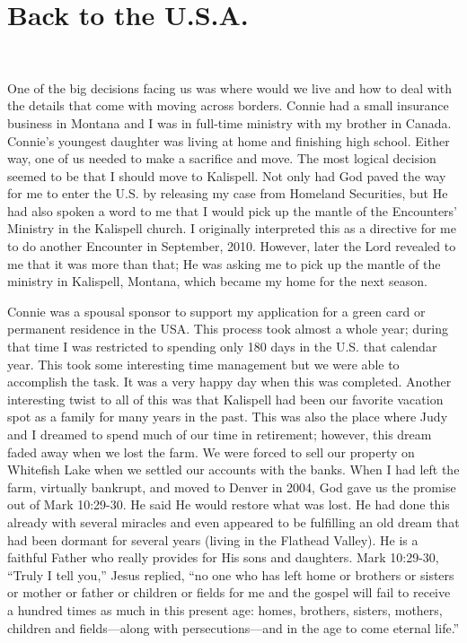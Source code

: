 \documentclass[oneside]{book}
\begin{document}
\section{Back to the U.S.A.}
\

One of the big decisions facing us was where would we live and how to deal with the details that come with moving across borders. Connie had a small insurance business in Montana and I was in full-time ministry with my brother in Canada. Connie’s youngest daughter was living at home and finishing high school. Either way, one of us needed to make a sacrifice and move. The most logical decision seemed to be that I should move to Kalispell. Not only had God paved the way for me to enter the U.S. by releasing my case from Homeland Securities, but He had also spoken a word to me that I would pick up the mantle of the Encounters’ Ministry in the Kalispell church. I originally interpreted this as a directive for me to do another Encounter in September, 2010. However, later the Lord revealed to me that it was more than that; He was asking me to pick up the mantle of the ministry in Kalispell, Montana, which became my home for the next season.

Connie was a spousal sponsor to support my application for a green card or permanent residence in the USA. This process took almost a whole year; during that time I was restricted to spending only 180 days in the U.S. that calendar year. This took some interesting time management but we were able to accomplish the task. It was a very happy day when this was completed. Another interesting twist to all of this was that Kalispell had been our favorite vacation spot as a family for many years in the past. This was also the place where Judy and I dreamed to spend much of our time in retirement; however, this dream faded away when we lost the farm. We were forced to sell our property on Whitefish Lake when we settled our accounts with the banks. When I had left the farm, virtually bankrupt, and moved to Denver in 2004, God gave us the promise out of Mark 10:29-30. He said He would restore what was lost. He had done this already with several miracles and even appeared to be fulfilling an old dream that had been dormant for several years (living in the Flathead Valley). He is a faithful Father who really provides for His sons and daughters. Mark 10:29-30, “Truly I tell you,” Jesus replied, “no one who has left home or brothers or sisters or mother or father or children or fields for me and the gospel will fail to receive a hundred times as much in this present age: homes, brothers, sisters, mothers, children and fields—along with persecutions—and in the age to come eternal life.”
\end{document}
